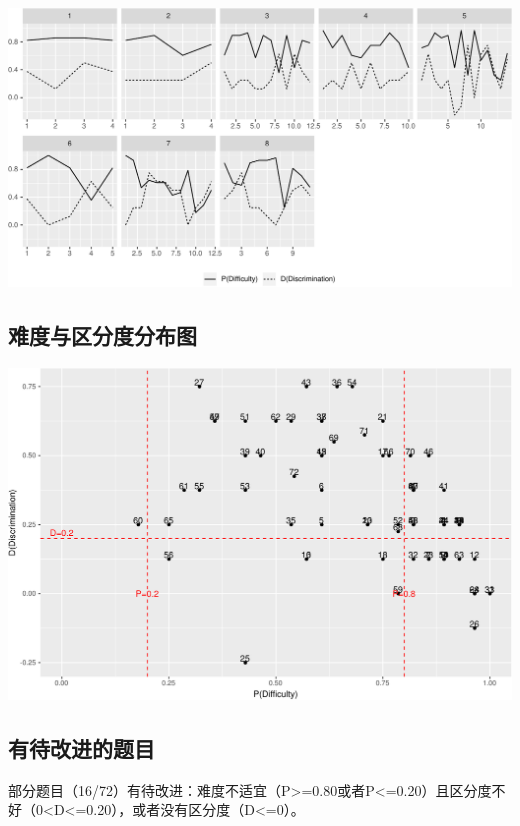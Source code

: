 \documentclass[hyperref,adobefonts]{ctexart}
\begin{document}
\includegraphics{ita_files/figure-latex/unnamed-chunk-18-1.pdf}

\subsection{难度与区分度分布图}

\includegraphics{ita_files/figure-latex/unnamed-chunk-20-1.pdf}

\subsection{有待改进的题目}

部分题目（16/72）有待改进：难度不适宜（P\textgreater{}=0.80或者P\textless{}=0.20）且区分度不好（0\textless{}D\textless{}=0.20），或者没有区分度（D\textless{}=0）。
\end{document}
